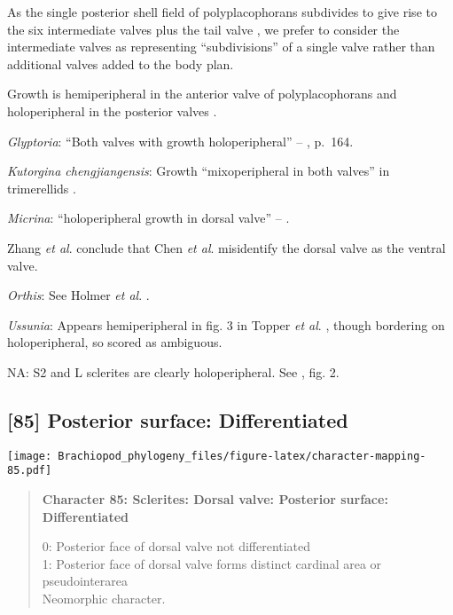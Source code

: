 \documentclass[openany]{book}
\theoremstyle{definition}
\theoremstyle{definition}
\theoremstyle{definition}
\theoremstyle{remark}
\begin{document}
As the single posterior shell field of polyplacophorans subdivides to
give rise to the six intermediate valves plus the tail valve
\citep{Wanninger2002C}, we prefer to consider the intermediate valves as
representing ``subdivisions'' of a single valve rather than additional
valves added to the body plan.

Growth is hemiperipheral in the anterior valve of polyplacophorans and
holoperipheral in the posterior valves \citep{Schwabe2010, Connors2012}.

\hypertarget{Glyptoria-coding-84}{}
\emph{Glyptoria}: ``Both valves with growth holoperipheral'' --
\citet{Williams2000LinguliformeaCraniiformea}, p.~164.

\hypertarget{Kutorgina_chengjiangensis-coding-84}{}
\emph{Kutorgina chengjiangensis}: Growth ``mixoperipheral in both
valves'' in trimerellids
\citep{Williams2000LinguliformeaCraniiformea, Popov1997}.

\hypertarget{Micrina-coding-84}{}
\emph{Micrina}: ``holoperipheral growth in dorsal valve'' --
\citet{Williams2007Supplement}.

Zhang \emph{et al}. \citeyearpar{Zhang2009Architectureand} conclude that
Chen \emph{et al}. \citeyearpar{Chen2007Reinterpretationof} misidentify
the dorsal valve as the ventral valve.

\hypertarget{Orthis-coding-84}{}
\emph{Orthis}: See Holmer \emph{et al}.
\citeyearpar{Holmer2008TheEarly}.

\hypertarget{Ussunia-coding-84}{}
\emph{Ussunia}: Appears hemiperipheral in fig. 3 in Topper \emph{et al}.
\citeyearpar{Topper2013Reappraisalof}, though bordering on
holoperipheral, so scored as ambiguous.

\hypertarget{NA-coding-84}{}
NA: S2 and L sclerites are clearly holoperipheral. See
\citet{Larsson2014iPaterimitra}, fig. 2.

\subsection*{{[}85{]} Posterior surface:
Differentiated}\label{posterior-surface-differentiated}

\texttt{[image: Brachiopod\_phylogeny\_files/figure-latex/character-mapping-85.pdf]}

\begin{quote}
\textbf{Character 85: Sclerites: Dorsal valve: Posterior surface:
Differentiated}

0: Posterior face of dorsal valve not differentiated\\
1: Posterior face of dorsal valve forms distinct cardinal area or
pseudointerarea\\
Neomorphic character.
\end{quote}
\end{document}
